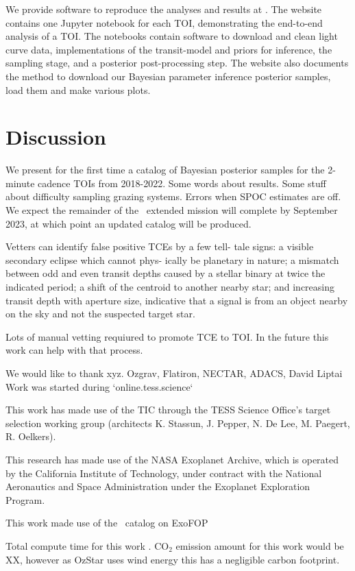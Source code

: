 \documentclass[linenumbers,floatfix,ApJL,twocolumn]{aastex631}
\begin{document}
We provide software to reproduce the analyses and results at \atlasUrl.
The website contains one Jupyter notebook for each TOI, demonstrating the end-to-end analysis of a TOI.
The notebooks contain software to download and clean light curve data, implementations of the transit-model and priors for inference, the \pymc sampling stage, and a posterior post-processing step.
The website also documents the method to download our Bayesian parameter inference posterior samples, load them and make various plots.

\section{Discussion}\label{sec:conclusion}
We present for the first time a catalog of Bayesian posterior samples for the 2-minute cadence TOIs from 2018-2022.
Some words about results.
Some stuff about difficulty sampling grazing systems.
Errors when SPOC estimates are off.
We expect the remainder of the \tess\ extended mission will complete by September 2023, at which point an updated catalog will be produced.

Vetters can identify false positive TCEs by a few tell- tale signs: a visible secondary eclipse which cannot phys- ically be planetary in nature; a mismatch between odd and even transit depths caused by a stellar binary at twice the indicated period; a shift of the centroid to another nearby star; and increasing transit depth with aperture size, indicative that a signal is from an object nearby on the sky and not the suspected target star.

Lots of manual vetting requiured to promote TCE to TOI. In the future this work can help with that process.


\begin{acknowledgments}

We would like to thank xyz.
Ozgrav, Flatiron, NECTAR, ADACS, David Liptai
Work was started during `online.tess.science`

This work has made use of the TIC through the TESS Science Office’s target selection working group (architects K. Stassun, J. Pepper, N. De Lee, M. Paegert, R. Oelkers).

This research has made use of the NASA Exoplanet Archive, which is operated by the California Institute of Technology, under contract with the National Aeronautics and Space Administration under the Exoplanet Exploration Program.

This work made use of the \tess\ catalog on ExoFOP

Total compute time for this work \red{\cpuHrs} . CO$_2$ emission amount for this work would be XX, however as OzStar uses wind energy this has a negligible carbon footprint.

\end{acknowledgments}
\end{document}
